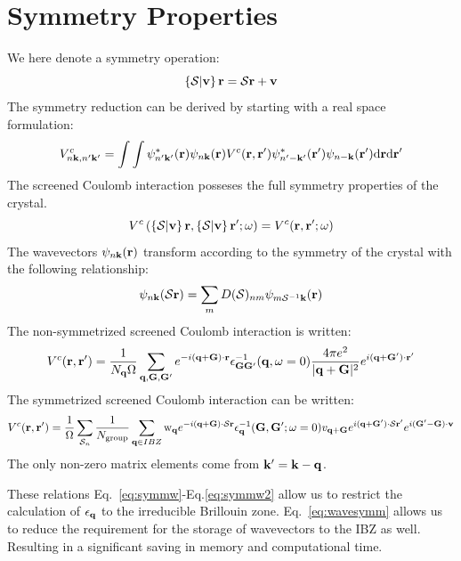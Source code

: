\documentclass{article}
\def\r{{\bf r}}
\def\rp{{\bf r^\prime}}
\def\k{{\bf k}}
\def\q{{\bf q}}
\def\G{{\bf G}}
\def\symm{\left\{\mathcal{S}|\mathbf{v}\right\}}
\def\S{\mathcal{S}}
\def\v{\mathbf{v}}
\def\symm{\left\{\mathcal{S}|\mathbf{v}\right\}}
\def\S{\mathcal{S}}
\begin{document}
\section{Symmetry Properties}
%
We here denote a symmetry operation:
%
\begin{equation}
  \label{eq:symmoperation}
  \symm\r = \S\r + \v
\end{equation}
%
The symmetry reduction can be derived by starting with a real space formulation:
%
\begin{equation}
\label{eq:vcmatel}
V^{c}_{n\k,n'\k'} = \int \int \psi^{*}_{n'\k'}(\r)\psi_{n\k}(\r)V^{c}(\r,\r')\psi^{*}_{n'-\k'}(\r')\psi_{n-\k}(\r')\rm{d}\r \rm{d}\r'
\end{equation}
%
The screened Coulomb interaction posseses the full symmetry properties of the crystal.
%
\begin{equation}
\label{eq:symmw}
V^{c}\left(\symm\r,\symm\rp;\omega\right) = V^{c}(\r,\rp;\omega)
\end{equation}
%
The wavevectors $\psi_{n\k}(\r)$ transform according to the symmetry of the crystal
with the following relationship:
%
\begin{equation}
\label{eq:wavesymm}
\psi_{n\k}(\S\r) = \sum_{m} D(\S)_{nm} \psi_{m\S^{-1}\k}(\r)
\end{equation}
%
The non-symmetrized screened Coulomb interaction is written:
%
\begin{equation}
V^{c}(\r,\r') = \frac{1}{N_{\q}\Omega}\sum_{\q,\G,\G'}e^{-i(\q+\G)\cdot\r} \epsilon^{-1}_{\G\G'}(\q,\omega=0)\frac{4\pi e^{2}}{|\q+\G|^{2}} e^{i(\q+\G')\cdot\r'}
\end{equation}
%
The symmetrized screened Coulomb interaction can be written:
%
\begin{equation}
\label{eq:symmw2}
V^{c}(\r,\r') = \frac{1}{\Omega}\sum_{\S_{n}}\frac{1}{N_{\rm group}}\sum_{\q\in IBZ}{\rm w_{\q}}e^{-i(\q+\G)\cdot\S\r}\epsilon^{-1}_{\q}(\G,\G';\omega=0)v_{\q+\G}e^{i(\q+\G')\cdot\S\r'}e^{i(\G'-\G)\cdot\v}
\end{equation}
%
The only non-zero matrix elements come from $\k'=\k-\q$.

These relations Eq.~\ref{eq:symmw}-Eq.\ref{eq:symmw2} allow 
us to restrict the calculation of $\epsilon_{\q}$ to the irreducible
Brillouin zone. Eq.~\ref{eq:wavesymm} allows us to 
reduce the requirement for the storage of
wavevectors to the IBZ as well. Resulting in a significant 
saving in memory and computational time.
\end{document}
